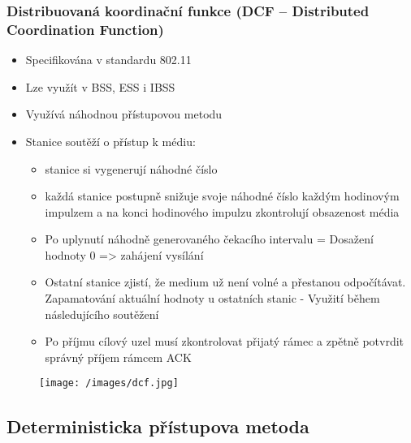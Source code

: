 \subsubsection{Distribuovaná koordinační funkce (DCF – Distributed Coordination Function) }
\begin{itemize}
    \item Specifikována v standardu 802.11 
    \item Lze využít v BSS, ESS i IBSS 
    \item Využívá náhodnou přístupovou metodu
    \item Stanice soutěží o přístup k médiu: 
    \begin{itemize}
    \item stanice si vygenerují náhodné číslo
    \item každá stanice postupně snižuje svoje náhodné číslo každým hodinovým impulzem
a na konci hodinového impulzu zkontrolují obsazenost média
    \item Po uplynutí náhodně generovaného čekacího intervalu = Dosažení hodnoty 0 =>
zahájení vysílání
    \item Ostatní stanice zjistí, že medium už není volné a přestanou odpočítávat.
Zapamatování aktuální hodnoty u ostatních stanic - Využití během následujícího
soutěžení
    \item Po příjmu cílový uzel musí zkontrolovat přijatý rámec a zpětně potvrdit správný
příjem rámcem ACK
    \end{itemize}
\end{itemize}
\begin{figure}[ht]
\centering
  \begin{center}
    \texttt{[image: /images/dcf.jpg]}
  \end{center}
\end{figure}

\subsection{Deterministicka přístupova metoda}
